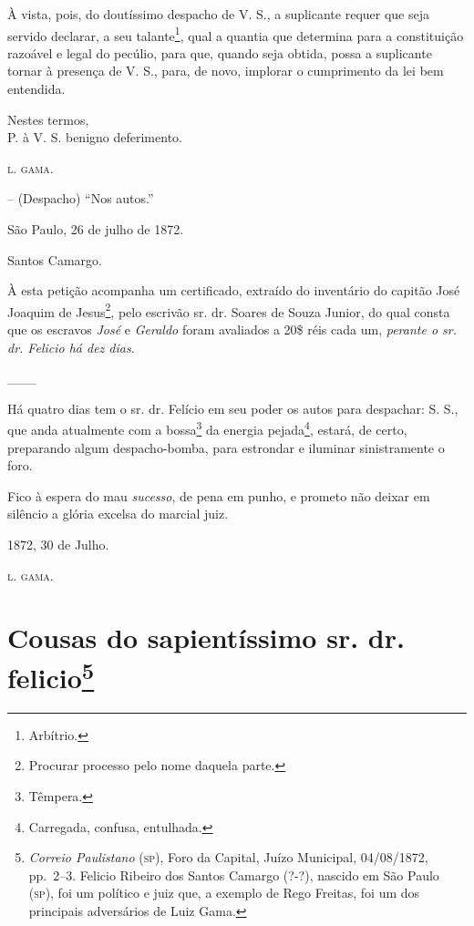 À vista, pois, do doutíssimo despacho de V. S., a suplicante requer que
seja servido declarar, a seu talante\footnote{ Arbítrio.}, qual a
quantia que determina para a constituição razoável e legal do pecúlio,
para que, quando seja obtida, possa a suplicante tornar à presença de V.
S., para, de novo, implorar o cumprimento da lei bem entendida.

Nestes termos,\\
P. à V. S. benigno deferimento.

\textsc{l. gama}.

-- (Despacho) ``Nos autos.''

São Paulo, 26 de julho de 1872.

Santos Camargo.

À esta petição acompanha um certificado, extraído do inventário do
capitão José Joaquim de Jesus\footnote{ Procurar processo pelo nome
  daquela parte.}, pelo escrivão sr. dr. Soares de Souza Junior, do qual
consta que os escravos \emph{José} e \emph{Geraldo} foram avaliados a
20\$ réis cada um, \emph{perante o sr. dr. Felicio há dez dias}.

\_\_\_

Há quatro dias tem o sr. dr. Felício em seu poder os autos para
despachar: S. S., que anda atualmente com a bossa\footnote{ Têmpera.}
da energia pejada\footnote{ Carregada, confusa, entulhada.}, estará, de
certo, preparando algum despacho-bomba, para estrondar e iluminar
sinistramente o foro.

Fico à espera do mau \emph{sucesso}, de pena em punho, e prometo não
deixar em silêncio a glória excelsa do marcial juiz.

1872, 30 de Julho.

\textsc{l. gama}.

\chapter{Cousas do sapientíssimo sr. dr. felicio\footnote{\emph{Correio Paulistano} (\textsc{sp}), Foro da Capital, Juízo
  Municipal, 04/08/1872, pp.~2--3. Felicio Ribeiro dos Santos Camargo
  (?-?), nascido em São Paulo (\textsc{sp}), foi um político e juiz que, a
  exemplo de Rego Freitas, foi um dos principais adversários de Luiz
  Gama.}} %

